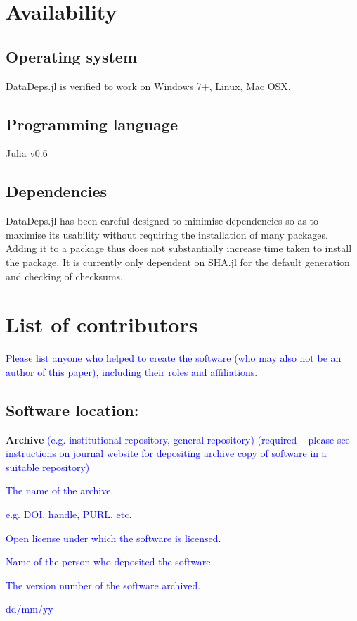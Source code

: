 \documentclass{jors}
\begin{document}
\section{Availability}
\subsection{Operating system}
DataDeps.jl is verified to work on Windows 7+, Linux, Mac OSX.

\subsection{Programming language}
Julia v0.6

\subsection{Dependencies}
DataDeps.jl has been careful designed to minimise dependencies so as to maximise its usability without requiring the installation of many packages.
Adding it to a package thus does not substantially increase time taken to install the package.
It is currently only dependent on SHA.jl for the default generation and checking of checksums.

\section*{List of contributors}

\textcolor{blue}{Please list anyone who helped to create the software (who may also not be an author of this paper), including their roles and affiliations.}

\subsection{Software location:}

{\bf Archive} \textcolor{blue}{(e.g. institutional repository, general repository) (required – please see instructions on journal website for depositing archive copy of software in a suitable repository)} 

\begin{description}[noitemsep,topsep=0pt]
	\item[Name:] \textcolor{blue}{The name of the archive.}
	\item[Persistent identifier:] \textcolor{blue}{e.g. DOI, handle, PURL, etc.}
	\item[Licence:] \textcolor{blue}{Open license under which the software is licensed.}
	\item[Publisher:]  \textcolor{blue}{Name of the person who deposited the software.}
	\item[Version published:] \textcolor{blue}{The version number of the software archived.}
	\item[Date published:] \textcolor{blue}{dd/mm/yy}
\end{description}
\end{document}
